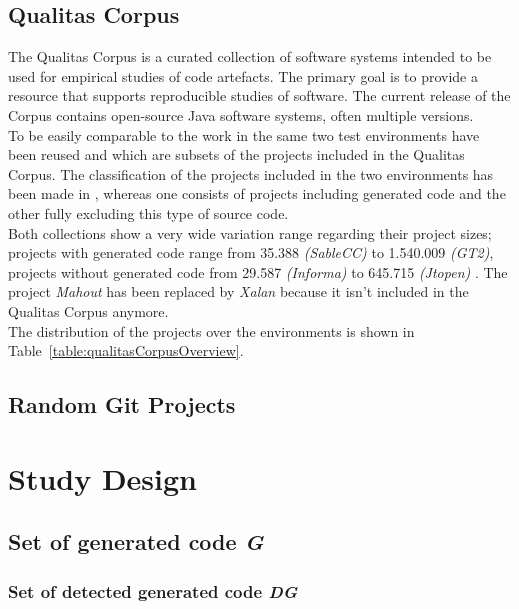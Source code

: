 \subsection{Qualitas Corpus}
The Qualitas Corpus is a curated collection of software systems intended to be used for empirical studies of code artefacts. The primary goal is to provide a resource that supports reproducible studies of software. The current release of the Corpus contains open-source Java software systems, often multiple versions. \cite{Tempero2010} \\
To be easily comparable to the work in \cite{Bernwieser2014} the same two test environments have been reused and which are subsets of the projects included in the Qualitas Corpus. The classification of the projects included in the two environments has been made in \cite{Bernwieser2014}, whereas one consists of projects including generated code and the other fully excluding this type of source code.\\
Both collections show a very wide variation range regarding their project sizes; projects with generated code range from 35.388 \textit{(SableCC)} to 1.540.009 \textit{(GT2)}, projects without generated code from 29.587 \textit{(Informa)} to 645.715 \textit{(Jtopen)} \cite{Bernwieser2014}. The project \textit{Mahout} has been replaced by \textit{Xalan} because it isn't included in the Qualitas Corpus anymore.\\
The distribution of the projects over the environments is shown in Table~\ref{table:qualitasCorpusOverview}.

\subsection{Random Git Projects}

\section{Study Design}


\subsection{Set of generated code \textit{G}}

\subsubsection{Set of detected generated code \textit{DG}}

